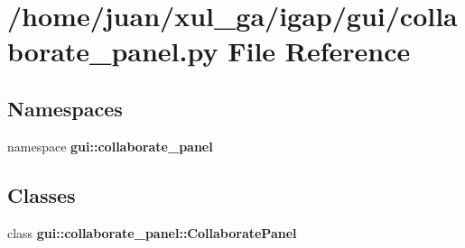 \section{/home/juan/xul\_\-ga/igap/gui/collaborate\_\-panel.py File Reference}
\label{collaborate__panel_8py}
\subsection*{Namespaces}
\begin{CompactItemize}
\item 
namespace {\bf gui::collaborate\_\-panel}
\end{CompactItemize}
\subsection*{Classes}
\begin{CompactItemize}
\item 
class {\bf gui::collaborate\_\-panel::CollaboratePanel}
\end{CompactItemize}
